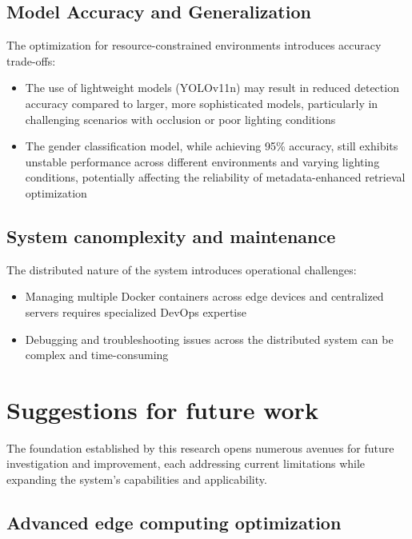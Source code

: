 \documentclass[../main.tex]{subfiles}
\begin{document}
\subsection{Model Accuracy and Generalization}

The optimization for resource-constrained environments introduces accuracy trade-offs:

\begin{itemize}
    \item The use of lightweight models (YOLOv11n) may result in reduced detection accuracy compared to larger, more sophisticated models, particularly in challenging scenarios with occlusion or poor lighting conditions
    \item The gender classification model, while achieving 95\% accuracy, still exhibits unstable performance across different environments and varying lighting conditions, potentially affecting the reliability of metadata-enhanced retrieval optimization
\end{itemize}

\subsection{System canomplexity and maintenance}

The distributed nature of the system introduces operational challenges:

\begin{itemize}
    \item Managing multiple Docker containers across edge devices and centralized servers requires specialized DevOps expertise
    \item Debugging and troubleshooting issues across the distributed system can be complex and time-consuming
\end{itemize}


\section{Suggestions for future work}

The foundation established by this research opens numerous avenues for future investigation and improvement, each addressing current limitations while expanding the system's capabilities and applicability.

\subsection{Advanced edge computing optimization}
\end{document}
